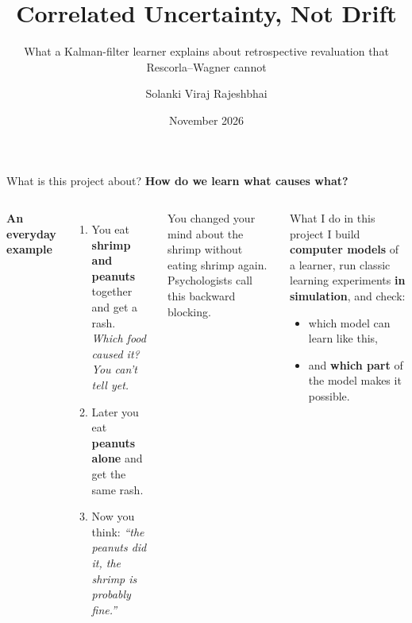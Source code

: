 \documentclass[aspectratio=169,11pt]{beamer}
\title{Correlated Uncertainty, Not Drift}
\subtitle{What a Kalman-filter learner explains about retrospective revaluation that Rescorla--Wagner cannot}
\author{Solanki Viraj Rajeshbhai \quad 24110348}
\institute{CG-501 Computation and Cognition --- End-Term Presentation}
\date{November 2026}
\begin{document}
\maketitle

\begin{frame}{What is this project about?}
\textbf{How do we learn what causes what?}
\vspace{0.5em}
\begin{columns}[T]
\small
\textbf{An everyday example}
\begin{enumerate}
\item You eat \textbf{shrimp and peanuts} together and get a rash.\\
\emph{Which food caused it? You can't tell yet.}
\item Later you eat \textbf{peanuts alone} and get the same rash.
\item Now you think: \emph{``the peanuts did it, the shrimp is probably fine.''}
\end{enumerate}
\vspace{0.3em}
You changed your mind about the shrimp \alert{without eating shrimp again}.
Psychologists call this \alert{backward blocking}.
\small
\begin{block}{What I do in this project}
I build \textbf{computer models} of a learner, run classic learning
experiments \textbf{in simulation}, and check:
\begin{itemize}
\item which model can learn like this,
\item and \textbf{which part} of the model makes it possible.
\end{itemize}
\end{block}
\end{columns}
\end{frame}
\end{document}
